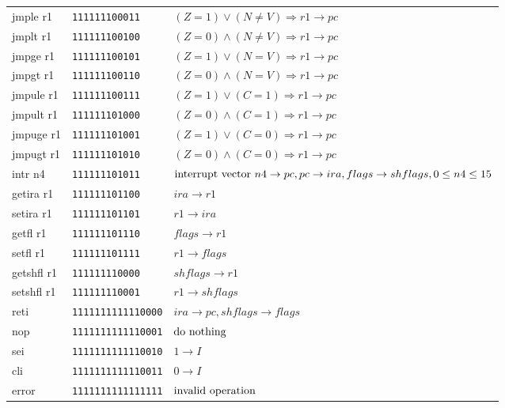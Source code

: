 \documentclass[10pt, twoside, a4paper]{article}
\begin{document}
{\begin{longtable}{llp{}}
    jmple r1          & \texttt{111111100011} & $(Z = 1) \vee (N \not = V) \Rightarrow r1 \rightarrow pc$ \\
    jmplt r1          & \texttt{111111100100} & $(Z = 0) \wedge (N \not = V) \Rightarrow r1 \rightarrow pc$ \\
    jmpge r1          & \texttt{111111100101} & $(Z = 1) \vee (N = V) \Rightarrow r1 \rightarrow pc$ \\
    jmpgt r1          & \texttt{111111100110} & $(Z = 0) \wedge (N = V) \Rightarrow r1 \rightarrow pc$ \\
    jmpule r1         & \texttt{111111100111} & $(Z = 1) \vee (C = 1) \Rightarrow r1 \rightarrow pc$ \\
    jmpult r1         & \texttt{111111101000} & $(Z = 0) \wedge (C = 1) \Rightarrow r1 \rightarrow pc$ \\
    jmpuge r1         & \texttt{111111101001} & $(Z = 1) \vee (C = 0) \Rightarrow r1 \rightarrow pc$ \\
    jmpugt r1         & \texttt{111111101010} & $(Z = 0) \wedge (C = 0) \Rightarrow r1 \rightarrow pc$ \\
    intr n4           & \texttt{111111101011} & $\textnormal{interrupt vector}\ n4 \rightarrow pc, pc \rightarrow ira, flags \rightarrow shflags, 0 \leq n4 \leq 15$ \\
    getira r1         & \texttt{111111101100} & $ira \rightarrow r1$ \\
    setira r1         & \texttt{111111101101} & $r1 \rightarrow ira$ \\
    getfl r1          & \texttt{111111101110} & $flags \rightarrow r1$ \\
    setfl r1          & \texttt{111111101111} & $r1 \rightarrow flags$ \\
    getshfl r1        & \texttt{111111110000} & $shflags \rightarrow r1$ \\
    setshfl r1        & \texttt{111111110001} & $r1 \rightarrow shflags$ \\
  \hline
    reti              & \texttt{1111111111110000} & $ira \rightarrow pc, shflags \rightarrow flags$ \\
    nop               & \texttt{1111111111110001} & $\textnormal{do nothing}$ \\
    sei               & \texttt{1111111111110010} & $1 \rightarrow I$ \\
    cli               & \texttt{1111111111110011} & $0 \rightarrow I$ \\
    error             & \texttt{1111111111111111} & $\textnormal{invalid operation}$ \\
  \end{longtable}}
\end{document}
